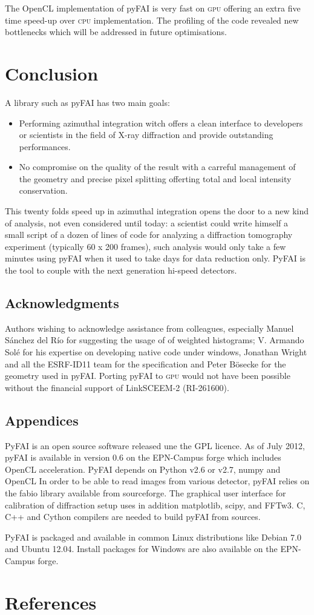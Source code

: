 \documentclass[a4paper]{jpconf}
\begin{document}
The OpenCL implementation of pyFAI is very fast on \textsc{gpu} offering an extra five
time speed-up over \textsc{cpu} implementation. The profiling of the code revealed new
bottlenecks which will be addressed in future optimisations.

\section{Conclusion}

A library such as pyFAI has two main goals:
\begin{itemize}
\item Performing azimuthal integration witch offers a clean interface to
developers or scientists in the field of X-ray diffraction and provide outstanding performances.
\item No compromise on the quality of the result with a carreful management of
the geometry and precise pixel splitting offerting total and local intensity
conservation.
\end{itemize}

This twenty folds speed up in azimuthal integration opens the door to a new
kind of analysis, not even considered until today: a scientist could write
himself a small script of a dozen of lines of code for analyzing a diffraction
tomography experiment (typically 60 x 200 frames), such analysis would only
take a few minutes using pyFAI when it used to take days for data reduction only.
PyFAI is the tool to couple with the next generation hi-speed detectors.

\subsection*{Acknowledgments}
Authors wishing to acknowledge assistance from
colleagues, especially Manuel S\'anchez del R\'io for suggesting the usage of
of weighted histograms;
V. Armando Sol\'e for his expertise on developing native code under windows,
Jonathan Wright and all the ESRF-ID11 team for the specification and Peter B\"osecke for
the geometry used in pyFAI. Porting pyFAI to \textsc{gpu} would not have been
possible without the financial support of LinkSCEEM-2 (RI-261600).

\subsection*{Appendices}
PyFAI is an open source software released une the GPL licence.
As of July 2012, pyFAI is available in version 0.6 on the EPN-Campus
forge\cite{forge} which includes OpenCL acceleration.
PyFAI depends on Python v2.6 or v2.7, numpy\cite{numpy} and OpenCL\cite{opencl}
In order to be able to read images from various detector, pyFAI relies on the
fabio\cite{fabio} library available from sourceforge. The graphical user
interface for calibration of diffraction setup uses in addition
matplotlib\cite{matplotlib}, scipy\cite{scipy}, and FFTw3\cite{fftw}.
C, C++ and Cython\cite{cython} compilers are needed to build pyFAI from sources.

PyFAI is packaged and available in common Linux distributions like Debian
7.0 and Ubuntu 12.04. Install packages for Windows are also
available on the EPN-Campus forge.

 \section*{References}


\end{document}
